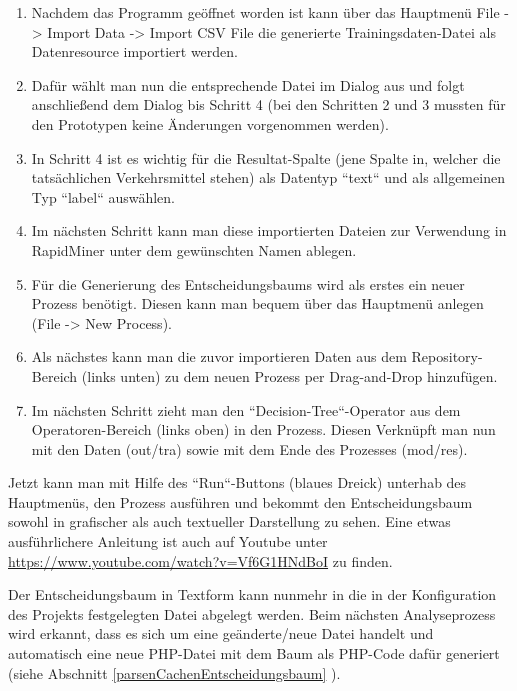 \begin{enumerate}
\item Nachdem das Programm geöffnet worden ist kann über das Hauptmenü File -> Import Data -> Import CSV File die generierte Trainingsdaten-Datei als Datenresource importiert werden. 
\item Dafür wählt man nun die entsprechende Datei im Dialog aus und folgt anschließend dem Dialog bis Schritt 4 (bei den Schritten 2 und 3 mussten für den Prototypen keine Änderungen vorgenommen werden). 
\item In Schritt 4 ist es wichtig für die Resultat-Spalte (jene Spalte in, welcher die tatsächlichen Verkehrsmittel stehen) als Datentyp ``text`` und als allgemeinen Typ ``label`` auswählen. 
\item Im nächsten Schritt kann man diese importierten Dateien zur Verwendung in RapidMiner unter dem gewünschten Namen ablegen.
\item Für die Generierung des Entscheidungsbaums wird als erstes ein neuer Prozess benötigt. Diesen kann man bequem über das Hauptmenü anlegen (File -> New Process).
\item Als nächstes kann man die zuvor importieren Daten aus dem Repository-Bereich (links unten) zu dem neuen Prozess per Drag-and-Drop hinzufügen. 
\item Im nächsten Schritt zieht man den ``Decision-Tree``-Operator aus dem Operatoren-Bereich (links oben) in den Prozess. Diesen Verknüpft man nun mit den Daten (out/tra) sowie mit dem Ende des Prozesses (mod/res).
\end{enumerate}

Jetzt kann man mit Hilfe des ``Run``-Buttons (blaues Dreick) unterhab des Hauptmenüs, den Prozess ausführen und bekommt den Entscheidungsbaum sowohl in grafischer als auch textueller Darstellung zu sehen. Eine etwas ausführlichere Anleitung ist auch auf Youtube unter \url{https://www.youtube.com/watch?v=Vf6G1HNdBoI} zu finden.

Der Entscheidungsbaum in Textform kann nunmehr in die in der Konfiguration des Projekts festgelegten Datei abgelegt werden. Beim nächsten Analyseprozess wird erkannt, dass es sich um eine geänderte/neue Datei handelt und automatisch eine neue PHP-Datei mit dem Baum als PHP-Code dafür generiert (siehe Abschnitt \ref{parsenCachenEntscheidungsbaum} ).